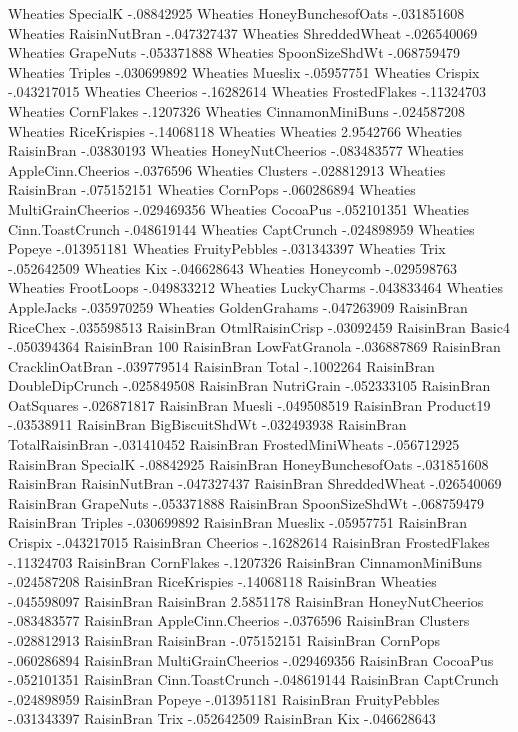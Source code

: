 Wheaties	SpecialK	-.08842925
Wheaties	HoneyBunchesofOats	-.031851608
Wheaties	RaisinNutBran	-.047327437
Wheaties	ShreddedWheat	-.026540069
Wheaties	GrapeNuts	-.053371888
Wheaties	SpoonSizeShdWt	-.068759479
Wheaties	Triples	-.030699892
Wheaties	Mueslix	-.05957751
Wheaties	Crispix	-.043217015
Wheaties	Cheerios	-.16282614
Wheaties	FrostedFlakes	-.11324703
Wheaties	CornFlakes	-.1207326
Wheaties	CinnamonMiniBuns	-.024587208
Wheaties	RiceKrispies	-.14068118
Wheaties	Wheaties	2.9542766
Wheaties	RaisinBran	-.03830193
Wheaties	HoneyNutCheerios	-.083483577
Wheaties	AppleCinn.Cheerios	-.0376596
Wheaties	Clusters	-.028812913
Wheaties	RaisinBran	-.075152151
Wheaties	CornPops	-.060286894
Wheaties	MultiGrainCheerios	-.029469356
Wheaties	CocoaPus	-.052101351
Wheaties	Cinn.ToastCrunch	-.048619144
Wheaties	CaptCrunch	-.024898959
Wheaties	Popeye	-.013951181
Wheaties	FruityPebbles	-.031343397
Wheaties	Trix	-.052642509
Wheaties	Kix	-.046628643
Wheaties	Honeycomb	-.029598763
Wheaties	FrootLoops	-.049833212
Wheaties	LuckyCharms	-.043833464
Wheaties	AppleJacks	-.035970259
Wheaties	GoldenGrahams	-.047263909
RaisinBran	RiceChex	-.035598513
RaisinBran	OtmlRaisinCrisp	-.03092459
RaisinBran	Basic4	-.050394364
RaisinBran	100%
RaisinBran	LowFatGranola	-.036887869
RaisinBran	CracklinOatBran	-.039779514
RaisinBran	Total	-.1002264
RaisinBran	DoubleDipCrunch	-.025849508
RaisinBran	NutriGrain	-.052333105
RaisinBran	OatSquares	-.026871817
RaisinBran	Muesli	-.049508519
RaisinBran	Product19	-.03538911
RaisinBran	BigBiscuitShdWt	-.032493938
RaisinBran	TotalRaisinBran	-.031410452
RaisinBran	FrostedMiniWheats	-.056712925
RaisinBran	SpecialK	-.08842925
RaisinBran	HoneyBunchesofOats	-.031851608
RaisinBran	RaisinNutBran	-.047327437
RaisinBran	ShreddedWheat	-.026540069
RaisinBran	GrapeNuts	-.053371888
RaisinBran	SpoonSizeShdWt	-.068759479
RaisinBran	Triples	-.030699892
RaisinBran	Mueslix	-.05957751
RaisinBran	Crispix	-.043217015
RaisinBran	Cheerios	-.16282614
RaisinBran	FrostedFlakes	-.11324703
RaisinBran	CornFlakes	-.1207326
RaisinBran	CinnamonMiniBuns	-.024587208
RaisinBran	RiceKrispies	-.14068118
RaisinBran	Wheaties	-.045598097
RaisinBran	RaisinBran	2.5851178
RaisinBran	HoneyNutCheerios	-.083483577
RaisinBran	AppleCinn.Cheerios	-.0376596
RaisinBran	Clusters	-.028812913
RaisinBran	RaisinBran	-.075152151
RaisinBran	CornPops	-.060286894
RaisinBran	MultiGrainCheerios	-.029469356
RaisinBran	CocoaPus	-.052101351
RaisinBran	Cinn.ToastCrunch	-.048619144
RaisinBran	CaptCrunch	-.024898959
RaisinBran	Popeye	-.013951181
RaisinBran	FruityPebbles	-.031343397
RaisinBran	Trix	-.052642509
RaisinBran	Kix	-.046628643
